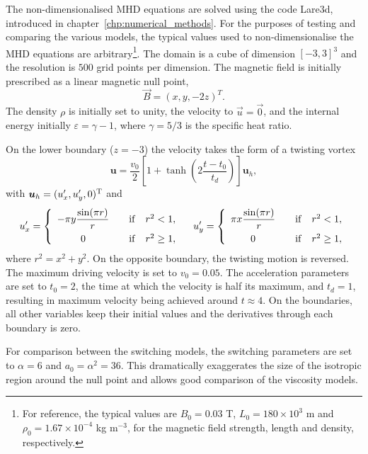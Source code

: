 The non-dimensionalised MHD equations are solved using the code Lare3d, introduced in chapter~\ref{chp:numerical_methods}. For the purposes of testing and comparing the various models, the typical values used to non-dimensionalise the MHD equations are arbitrary\footnote{For reference, the typical values are $B_0 = 0.03$ T, $L_0 = 180\times10^{3}$ m and $\rho_0 = 1.67\times10^{-4}$ kg m$^{-3}$, for the magnetic field strength, length and density, respectively.}. The domain is a cube of dimension $[-3, 3]^3$ and the resolution is $500$ grid points per dimension. The magnetic field is initially prescribed as a linear magnetic null point,
\begin{equation}
  \label{eq:null_mag_field}
\vec{B} = (x, y, -2z)^T.
\end{equation}
The density $\rho$ is initially set to unity, the velocity to $\vec{u} = \vec{0}$, and the internal energy initially $\varepsilon = \gamma-1$, where $\gamma = 5/3$ is the specific heat ratio.

On the lower boundary ($z=-3$) the velocity takes the form of a twisting vortex
\begin{equation}\label{ramp}
\boldsymbol{u} = \frac{v_0}{2}\left[1+\tanh\left(2\frac{t-t_0}{t_d}\right)\right]\boldsymbol{u}_h,
\end{equation}
with $\boldsymbol{u}_h = (u_x',u_y',0)^{\rm T}$ and
\begin{equation}\label{vprime}
u_x' = \left\{\begin{array}{cc}
-\pi y\displaystyle\frac{\sin(\pi r)}{r} &\quad{\rm if}\quad r^2<1, \\[8pt]
\displaystyle 0 &\quad{\rm if}\quad r^2 \ge 1,
\end{array}\right. \quad
u_y' = \left\{\begin{array}{cc}
\pi x\displaystyle\frac{\sin(\pi r)}{r} &\quad{\rm if}\quad r^2<1, \\[8pt]
\displaystyle 0 &\quad{\rm if}\quad r^2 \ge 1,
\end{array}\right.
\end{equation}
where $r^2=x^2+y^2$. On the opposite boundary, the twisting motion is reversed. The maximum driving velocity is set to $v_0 = 0.05$. The acceleration parameters are set to $t_0 = 2$, the time at which the velocity is half its maximum, and $t_d = 1$, resulting in maximum velocity being achieved around $t\approx4$. On the boundaries, all other variables keep their initial values and the derivatives through each boundary is zero.

For comparison between the switching models, the switching parameters are set to $\alpha = 6$ and $a_0 = \alpha^2 = 36$. This dramatically exaggerates the size of the isotropic region around the null point and allows good comparison of the viscosity models.

